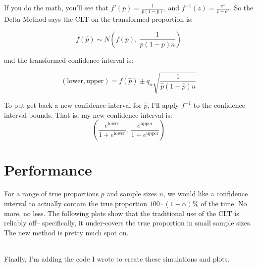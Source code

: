 \documentclass{article}
\begin{document}
\newpage
If you do the math, you'll see that $f'(p) = \frac{1}{p(1-p)}$, and $f^{-1}(z) = \frac{e^z}{1+e^z}$. So the Delta Method says the CLT on the transformed proportion is:

$$f(\hat{p}) \sim N\left(f(p),\ \frac{1}{p(1-p)n}\right)$$

and the transformed confidence interval is:

$$(\text{lower}, \text{upper}) = f(\hat{p}) \pm q_\alpha\sqrt{\frac{1}{\hat{p}(1-\hat{p})n}}$$

To put get back a new confidence interval for $\hat{p}$, I'll apply $f^{-1}$ to the confidence interval bounds. That is, my new confidence interval is:$$\left(\frac{e^\text{lower}}{1+e^\text{lower}},\ \frac{e^\text{upper}}{1+e^\text{upper}}\right)$$

\section*{Performance}

For a range of true proportions $p$ and sample sizes $n$, we would like a confidence interval to actually contain the true proportion $100\cdot(1-\alpha)\%$ of the time. No more, no less. The following plots show that the traditional use of the CLT is reliably off-- specifically, it under-covers the true proportion in small sample sizes. The new method is pretty much spot on.

\ \\
Finally, I'm adding the code I wrote to create these simulations and plots.
\end{document}
